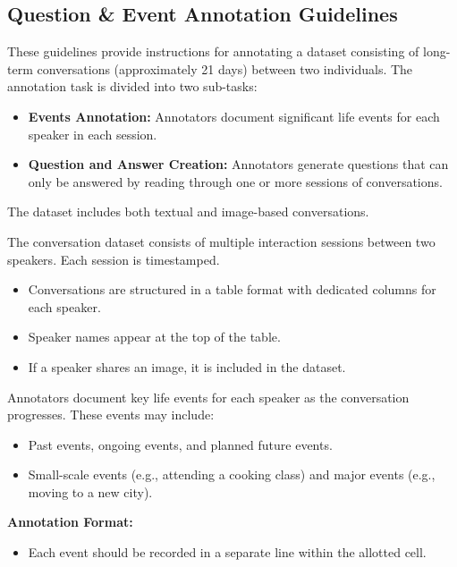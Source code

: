 \subsection{Question \& Event Annotation Guidelines}
\label{appendix:qa-guidelines}

\begin{tcolorbox}[title=Question \& Event Annotation Guidelines, myboxstyle, breakable]
\begin{description}[align=left, labelwidth=5em, labelindent=0em, itemsep=1em]

\item[\textbf{Introduction.}] These guidelines provide instructions for annotating a dataset consisting of long-term conversations (approximately 21 days) between two individuals. The annotation task is divided into two sub-tasks:
    \begin{itemize}
        \item \textbf{Events Annotation:} Annotators document significant life events for each speaker in each session.
        \item \textbf{Question and Answer Creation:} Annotators generate questions that can only be answered by reading through one or more sessions of conversations.
    \end{itemize}
    The dataset includes both textual and image-based conversations.

\item[\textbf{Data Format.}] The conversation dataset consists of multiple interaction sessions between two speakers. Each session is timestamped.
    \begin{itemize}
        \item Conversations are structured in a table format with dedicated columns for each speaker.
        \item Speaker names appear at the top of the table.
        \item If a speaker shares an image, it is included in the dataset.
    \end{itemize}

\item[\textbf{Sub-Task 1: Writing Speaker Events.}] Annotators document key life events for each speaker as the conversation progresses. These events may include:
    \begin{itemize}
        \item Past events, ongoing events, and planned future events.
        \item Small-scale events (e.g., attending a cooking class) and major events (e.g., moving to a new city).
    \end{itemize}
    \textbf{Annotation Format:}  
    \begin{itemize}
        \item Each event should be recorded in a separate line within the allotted cell.
    \end{itemize}


\end{description}
\end{tcolorbox}
